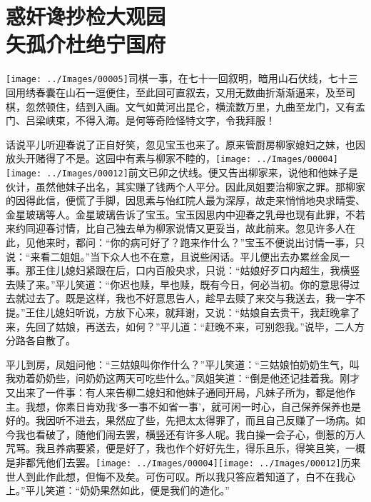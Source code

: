 \chapter{惑奸谗抄检大观园\\矢孤介杜绝宁国府}\label{part0078_split_000.htmlux5cux23calibre_pb_0}
{\texttt{[image: ../Images/00005]}\kaishu 司棋一事，在七十一回叙明，暗用山石伏线，七十三回用绣春囊在山石一逗便住，至此回可直叙去，又用无数曲折渐渐逼来，及至司棋，忽然顿住，结到入画。文气如黄河出昆仑，横流数万里，九曲至龙门，又有孟门、吕梁峡束，不得入海。是何等奇险怪特文字，令我拜服！}

话说平儿听迎春说了正自好笑，忽见宝玉也来了。原来管厨房柳家媳妇之妹，也因放头开赌得了不是。这园中有素与柳家不睦的，{\texttt{[image: ../Images/00004]}\texttt{[image: ../Images/00012]}\footnotesize \kaishu 前文已卯之伏线。}便又告出柳家来，说他和他妹子是伙计，虽然他妹子出名，其实赚了钱两个人平分。因此凤姐要治柳家之罪。那柳家的因得此信，便慌了手脚，因思素与怡红院人最为深厚，故走来悄悄地央求晴雯、金星玻璃等人。金星玻璃告诉了宝玉。宝玉因思内中迎春之乳母也现有此罪，不若来约同迎春讨情，比自己独去单为柳家说情又更妥当，故此前来。忽见许多人在此，见他来时，都问：``你的病可好了？跑来作什么？''宝玉不便说出讨情一事，只说：``来看二姐姐。''当下众人也不在意，且说些闲话。平儿便出去办累丝金凤一事。那王住儿媳妇紧跟在后，口内百般央求，只说：``姑娘好歹口内超生，我横竖去赎了来。''平儿笑道：``你迟也赎，早也赎，既有今日，何必当初。你的意思得过去就过去了。既是这样，我也不好意思告人，趁早去赎了来交与我送去，我一字不提。''王住儿媳妇听说，方放下心来，就拜谢，又说：``姑娘自去贵干，我赶晚拿了来，先回了姑娘，再送去，如何？''平儿道：``赶晚不来，可别怨我。''说毕，二人方分路各自散了。

平儿到房，凤姐问他：``三姑娘叫你作什么？''平儿笑道：``三姑娘怕奶奶生气，叫我劝着奶奶些，问奶奶这两天可吃些什么。''凤姐笑道：``倒是他还记挂着我。刚才又出来了一件事：有人来告柳二媳妇和他妹子通同开局，凡妹子所为，都是他作主。我想，你素日肯劝我`多一事不如省一事'，就可闲一时心，自己保养保养也是好的。我因听不进去，果然应了些，先把太太得罪了，而且自己反赚了一场病。如今我也看破了，随他们闹去罢，横竖还有许多人呢。我白操一会子心，倒惹的万人咒骂。我且养病要紧，便是好了，我也作个好好先生，得乐且乐，得笑且笑，一概是非都凭他们去罢。{\texttt{[image: ../Images/00004]}\texttt{[image: ../Images/00012]}\footnotesize \kaishu 历来世人到此作此想，但悔不及矣。可伤可叹。}所以我只答应着知道了，白不在我心上。''平儿笑道：``奶奶果然如此，便是我们的造化。''

